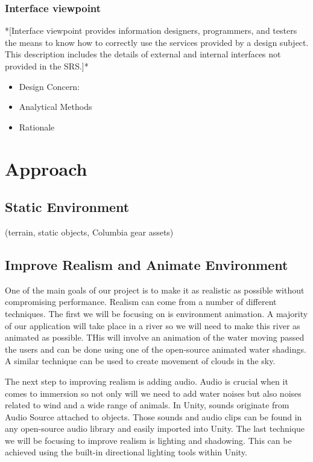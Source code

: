 \documentclass[10pt,journal,compsoc,onecolumn, draftclsnofoot]{IEEEtran}
\begin{document}
\subsubsection{Interface viewpoint}
*[Interface viewpoint provides information designers, programmers, and testers the means to know how to correctly use the services provided by a design subject. This description includes the details of external and internal interfaces not provided in the SRS.]*
\begin{itemize}
  \item Design Concern:
  \item Analytical Methods
  \item Rationale
\end{itemize}


\section{Approach}
\subsection{Static Environment}
(terrain, static objects, Columbia gear assets)

\subsection{Improve Realism and Animate Environment}
One of the main goals of our project is to make it as realistic as possible
without compromising performance. Realism can come from a number of different
techniques. The first we will be focusing on is environment animation. A
majority of our application will take place in a river so we will need to make
this river as animated as possible. THis will involve an animation of the
water moving passed the users and can be done using one of the open-source
animated water shadings. A similar technique can be used to create movement of
clouds in the sky.

The next step to improving realism is adding audio. Audio is crucial when it
comes to immersion so not only will we need to add water noises but also noises
related to wind and a wide range of animals. In Unity, sounds originate from
Audio Source attached to objects. Those sounds and audio clips can be found in
any open-source audio library and easily imported into Unity. The last
technique we will be focusing to improve realism is lighting and shadowing.
This can be achieved using the built-in directional lighting tools within Unity.
\end{document}
